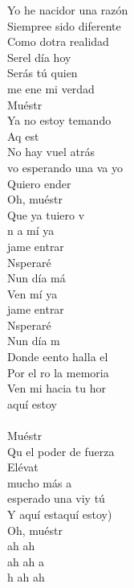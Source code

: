\begin{cancion}
\jump
	Yo he nacidor una razón\\
\jump
	Siempree sido diferente	\\
	Como dotra realidad\\
	Serel día hoy\\
Serás tú quien\\
	me ene mi verdad  \\
\jump
	Muéstr   \\
	Ya no estoy temando\\
	Aq est\\
	No hay vuel atrás\\
	vo esperando una va yo\\
\jump
	Quiero ender       \\
	Oh, muéstr   \\
	Que ya tuiero v\\
\jump
	n a mí ya\\
	jame entrar \\
	Nsperaré\\
	Nun día má\\
\jump
	Ven mí ya\\
	jame entrar \\
	Nsperaré\\
	Nun día m         \\
\jump
	Donde eento halla el\\
	Por el ro la memoria\\
	Ven mi hacia tu hor\\
aquí estoy\\
	\jump\\
\jump
	Muéstr    \\
	Qu el poder de fuerza\\
	Elévat    \\
	mucho más a \\
\jump
	 esperado una viy tú\\
	Y aquí estaquí estoy)         \\
	Oh, muéstr   \\
	ah ah\\
	ah ah a\\
	h ah ah\\
\end{cancion}%
